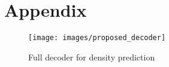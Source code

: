 \chapter{Appendix}

\begin{figure}[h]
\centering
\texttt{[image: images/proposed\_decoder]}
\caption{Full decoder for density prediction}
\label{fig:unified_proposed_model}
\end{figure}
